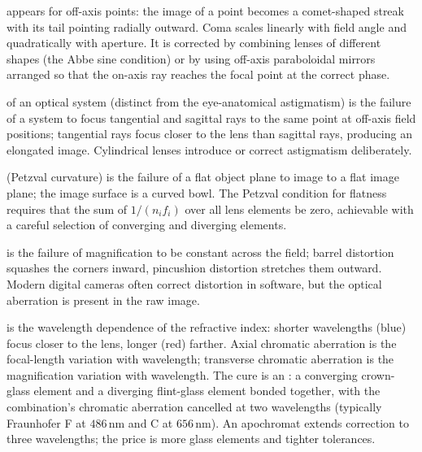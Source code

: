  appears for off-axis points: the image of a point
becomes a comet-shaped streak with its tail pointing radially outward.
Coma scales linearly with field angle and quadratically with aperture.
It is corrected by combining lenses of different shapes (the Abbe
sine condition) or by using off-axis paraboloidal mirrors arranged so
that the on-axis ray reaches the focal point at the correct phase.

 of an optical system (distinct from the
eye-anatomical astigmatism) is the failure of a system to focus
tangential and sagittal rays to the same point at off-axis field
positions; tangential rays focus closer to the lens than sagittal
rays, producing an elongated image. Cylindrical lenses introduce or
correct astigmatism deliberately.

 (Petzval curvature) is the failure of a
flat object plane to image to a flat image plane; the image surface
is a curved bowl. The Petzval condition for flatness requires that
the sum of $1/(n_{i}f_{i})$ over all lens elements be zero, achievable
with a careful selection of converging and diverging elements.

 is the failure of magnification to be constant
across the field; barrel distortion squashes the corners inward,
pincushion distortion stretches them outward. Modern digital cameras
often correct distortion in software, but the optical aberration is
present in the raw image.

 is the wavelength dependence of the
refractive index: shorter wavelengths (blue) focus closer to the
lens, longer (red) farther. Axial chromatic aberration is the
focal-length variation with wavelength; transverse chromatic
aberration is the magnification variation with wavelength. The cure
is an : a converging crown-glass element
and a diverging flint-glass element bonded together, with the
combination's chromatic aberration cancelled at two wavelengths
(typically Fraunhofer F at $486\,\si{\nano\meter}$ and C at $656\,\si{
\nano\meter}$). An apochromat extends correction to three wavelengths;
the price is more glass elements and tighter tolerances.

